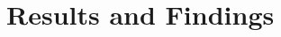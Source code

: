 \documentclass{aer1315-pretty}
\begin{document}
%
%
%





\section{Results and Findings} \label{sec:results}
\end{document}
